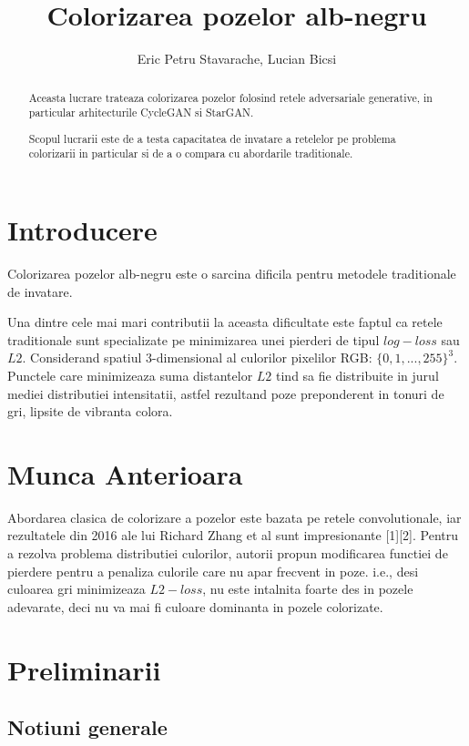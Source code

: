 \documentclass[12pt]{article}
\title{Colorizarea pozelor alb-negru}
\date{}
\author{Eric Petru Stavarache, Lucian Bicsi}
\theoremstyle{definition}
\begin{document}
\maketitle

\tableofcontents


\begin{abstract}
    Aceasta lucrare trateaza colorizarea pozelor folosind retele adversariale generative, in particular arhitecturile CycleGAN si StarGAN.
    
    Scopul lucrarii este de a testa capacitatea de invatare a retelelor pe problema colorizarii in particular si de a o compara cu abordarile traditionale.
\end{abstract}

\section{Introducere}

Colorizarea pozelor alb-negru este o sarcina dificila pentru metodele traditionale de invatare.

Una dintre cele mai mari contributii la aceasta dificultate este faptul ca retele traditionale sunt specializate pe minimizarea unei pierderi de tipul $log-loss$ sau $L2$.
Considerand spatiul 3-dimensional al culorilor pixelilor RGB: $\{0, 1, ..., 255 \}^{3}$. Punctele care minimizeaza suma distantelor $L2$ tind sa fie distribuite in jurul mediei distributiei intensitatii, astfel rezultand poze preponderent in tonuri de gri, lipsite de vibranta colora.

\section{Munca Anterioara}

Abordarea clasica de colorizare a pozelor este bazata pe retele convolutionale, iar rezultatele din 2016 ale lui Richard Zhang et al sunt impresionante [1][2].
Pentru a rezolva problema distributiei culorilor, autorii propun modificarea functiei de pierdere pentru a penaliza culorile care nu apar frecvent in poze.
i.e., desi culoarea gri minimizeaza $L2-loss$, nu este intalnita foarte des in pozele adevarate, deci nu va mai fi culoare dominanta in pozele colorizate.


\section{Preliminarii}

\subsection{Notiuni generale}
\end{document}
